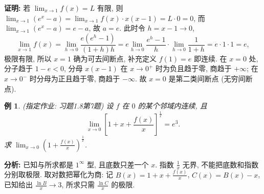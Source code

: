 \documentclass[UTF8,openany]{ctexbook}
\theoremstyle{chinesetextbook}
\newtheorem{example}{例}[section]
\newenvironment{cnproof}{\par\indent\textbf{证明:} \ignorespaces}{\par}
\begin{document}
\begin{cnproof}
若 $\displaystyle\lim_{x\to1}f(x)=L$ 有限, 则 $\displaystyle\lim_{x\to1}(e^x-a)=\lim_{x\to1}f(x)\cdot x(x-1)=L\cdot0=0$, 而 $\displaystyle\lim_{x\to1}(e^x-a)=e-a$, 故 $a=e$. 此时令 $h=x-1\to0$,
\[
\lim_{x\to1}f(x)=\lim_{h\to0}\frac{e(e^h-1)}{(1+h)h}
=e\lim_{h\to0}\frac{e^h-1}h\cdot\lim_{h\to0}\frac1{1+h}=e\cdot1\cdot1=e,
\]
极限有限, 所以 $x=1$ 确为可去间断点, 补充定义 $f(1)=e$ 即连续. 在 $x=0$ 处, 分子趋于 $1-e<0$, 分母 $x(x-1)$ 在 $x\to0^+$ 时为负且趋于零, 商趋于 $+\infty$; 在 $x\to0^-$ 时分母为正且趋于零, 商趋于 $-\infty$. 故 $x=0$ 是第二类间断点 (无穷间断点).
\end{cnproof}
\begin{example}
\textnormal{(指定作业: 习题1.8第7题)} 设 $f$ 在 $0$ 的某个邻域内连续, 且
\[
\lim_{x\to0}\left[1+x+\frac{f(x)}x\right]^{\frac1x}=e^3.
\]
求 $\displaystyle\lim_{x\to0}\left(1+\frac{f(x)}x\right)^{\frac1x}$.
\end{example}
\par\indent\textbf{分析:} 已知与所求都是 $1^\infty$ 型, 且底数只差一个 $x$. 指数 $\displaystyle\frac1x$ 无界, 不能把底数和指数分别取极限. 取对数把幂化为商: 记 $\displaystyle B(x)=1+x+\frac{f(x)}x$, $C(x)=B(x)-x$, 已知给出 $\displaystyle\frac{\ln B}x\to3$, 所求只需 $\displaystyle\frac{\ln C}x$ 的极限.
\end{document}
